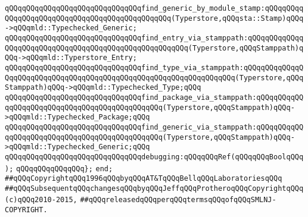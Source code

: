 \verb|qQQqqQQqqQQqqQQqqQQqqQQqqQQqqQQqfind_generic_by_module_stamp:qQQqqQQqqQQqqQQqqQQqqQQqqQQqqQQqqQQqqQQqqQQqqQQq(Typerstore,qQQqsta::Stamp)qQQq->qQQqmld::Typechecked_Generic;|\newline
\newline
\verb|qQQqqQQqqQQqqQQqqQQqqQQqqQQqqQQqfind_entry_via_stamppath:qQQqqQQqqQQqqQQqqQQqqQQqqQQqqQQqqQQqqQQqqQQqqQQqqQQqqQQq(Typerstore,qQQqStamppath)qQQq->qQQqmld::Typerstore_Entry;|\newline
\verb|qQQqqQQqqQQqqQQqqQQqqQQqqQQqqQQqfind_type_via_stamppath:qQQqqQQqqQQqqQQqqQQqqQQqqQQqqQQqqQQqqQQqqQQqqQQqqQQqqQQqqQQqqQQqqQQq(Typerstore,qQQqStamppath)qQQq->qQQqmld::Typechecked_Type;qQQq|\newline
\verb|qQQqqQQqqQQqqQQqqQQqqQQqqQQqqQQqfind_package_via_stamppath:qQQqqQQqqQQqqQQqqQQqqQQqqQQqqQQqqQQqqQQqqQQqqQQq(Typerstore,qQQqStamppath)qQQq->qQQqmld::Typechecked_Package;qQQq|\newline
\verb|qQQqqQQqqQQqqQQqqQQqqQQqqQQqqQQqfind_generic_via_stamppath:qQQqqQQqqQQqqQQqqQQqqQQqqQQqqQQqqQQqqQQqqQQqqQQq(Typerstore,qQQqStamppath)qQQq->qQQqmld::Typechecked_Generic;qQQq|\newline
\newline
\verb|qQQqqQQqqQQqqQQqqQQqqQQqqQQqqQQqdebugging:qQQqqQQqRef(qQQqqQQqBoolqQQq);|\newline
\verb|qQQqqQQqqQQqqQQq};|\newline
\verb|end;|\newline
\newline
\newline
\verb|##qQQqCopyrightqQQq1996qQQqbyqQQqAT&TqQQqBellqQQqLaboratoriesqQQq|\newline
\verb|##qQQqSubsequentqQQqchangesqQQqbyqQQqJeffqQQqProtheroqQQqCopyrightqQQq(c)qQQq2010-2015,|\newline
\verb|##qQQqreleasedqQQqperqQQqtermsqQQqofqQQqSMLNJ-COPYRIGHT.|\newline

